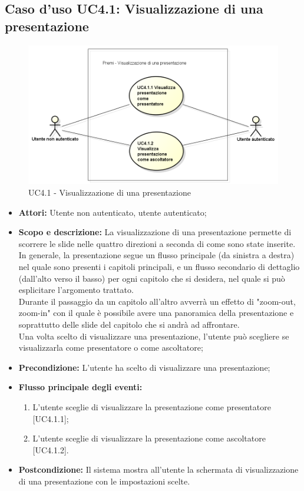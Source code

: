 \subsection{Caso d'uso UC4.1: Visualizzazione di una presentazione}
\begin{figure}[h] 
	\centering 
	\includegraphics[scale=0.45] {img/UC4.1.png}
	\caption{UC4.1 - Visualizzazione di una presentazione} 
\end{figure}

\begin{itemize}
	\item \textbf{Attori:} Utente non autenticato, utente autenticato;
	\item \textbf{Scopo e descrizione:} La visualizzazione di una presentazione permette di scorrere le \gls{slide} nelle quattro direzioni a seconda di come sono state inserite. In generale, la presentazione segue un flusso principale (da sinistra a destra) nel quale sono presenti i capitoli principali, e un flusso secondario di dettaglio (dall'alto verso il basso) per ogni capitolo che si desidera, nel quale si può esplicitare l'argomento trattato.\\
	Durante il passaggio da un capitolo all'altro avverrà un effetto di "zoom-out, zoom-in" con il quale è possibile avere una panoramica della presentazione e soprattutto delle \gls{slide} del capitolo che si andrà ad affrontare.\\
	Una volta scelto di visualizzare una presentazione, l'utente può scegliere se visualizzarla come presentatore o come ascoltatore;
	\item \textbf{Precondizione:} L'utente ha scelto di visualizzare una presentazione;
	\item \textbf{Flusso principale degli eventi:}
	\begin{enumerate}
		\item L'utente sceglie di visualizzare la presentazione come presentatore [UC4.1.1];
		\item L'utente sceglie di visualizzare la presentazione come ascoltatore [UC4.1.2].
	\end{enumerate}
	\item \textbf{Postcondizione:} Il sistema mostra all'utente la schermata di visualizzazione di una presentazione con le impostazioni scelte.
\end{itemize}

